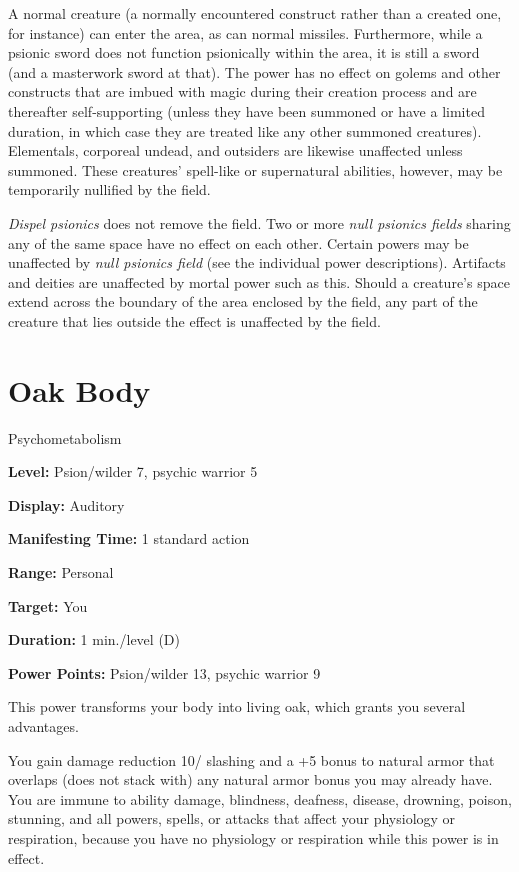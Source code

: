\documentclass{article}
\begin{document}
A normal creature (a normally encountered construct rather than a created one, 
for instance) can enter the area, as can normal missiles. Furthermore, while a 
psionic sword does not function psionically within the area, it is still a sword 
(and a masterwork sword at that). The power has no effect on golems and other constructs 
that are imbued with magic during their creation process and are thereafter self-supporting 
(unless they have been summoned or have a limited duration, in which case they 
are treated like any other summoned creatures). Elementals, corporeal undead, and 
outsiders are likewise unaffected unless summoned. These creatures' spell-like 
or supernatural abilities, however, may be temporarily nullified by the field.

\textit{Dispel psionics }does not remove the field. Two or more \textit{null psionics 
fields }sharing any of the same space have no effect on each other. Certain powers 
may be unaffected by \textit{null psionics field }(see the individual power descriptions). 
Artifacts and deities are unaffected by mortal power such as this. Should a creature's 
space extend across the boundary of the area enclosed by the field, any part of 
the creature that lies outside the effect is unaffected by the field.

\vspace{12pt}
\section*{Oak Body}

Psychometabolism

\textbf{Level:} Psion/wilder 7, psychic warrior 5

\textbf{Display:} Auditory

\textbf{Manifesting Time:} 1 standard action

\textbf{Range:} Personal

\textbf{Target:} You

\textbf{Duration:} 1 min./level (D)

\textbf{Power Points:} Psion/wilder 13, psychic warrior 9

This power transforms your body into living oak, which grants you several advantages.

You gain damage reduction 10/ slashing and a +5 bonus to natural armor that overlaps 
(does not stack with) any natural armor bonus you may already have. You are immune 
to ability damage, blindness, deafness, disease, drowning, poison, stunning, and 
all powers, spells, or attacks that affect your physiology or respiration, because 
you have no physiology or respiration while this power is in effect.
\end{document}
